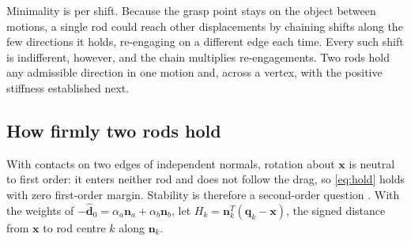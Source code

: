 Minimality is per shift. Because the grasp point stays on the object between motions, a single rod could reach other displacements by chaining shifts along the few directions it holds, re-engaging on a different edge each time. Every such shift is indifferent, however, and the chain multiplies re-engagements. Two rods hold any admissible direction in one motion and, across a vertex, with the positive stiffness established next.

\subsection{How firmly two rods hold}
With contacts on two edges of independent normals, rotation about $\mathbf x$ is neutral to first order: it enters neither rod and does not follow the drag, so \eqref{eq:hold} holds with zero first-order margin. Stability is therefore a second-order question \cite{rimon1998mobility}. With the weights of $-\hat{\mathbf d}_0=\alpha_a\mathbf n_a+\alpha_b\mathbf n_b$, let $H_k=\mathbf n_k^T(\mathbf q_k-\mathbf x)$, the signed distance from $\mathbf x$ to rod centre $k$ along $\mathbf n_k$.

